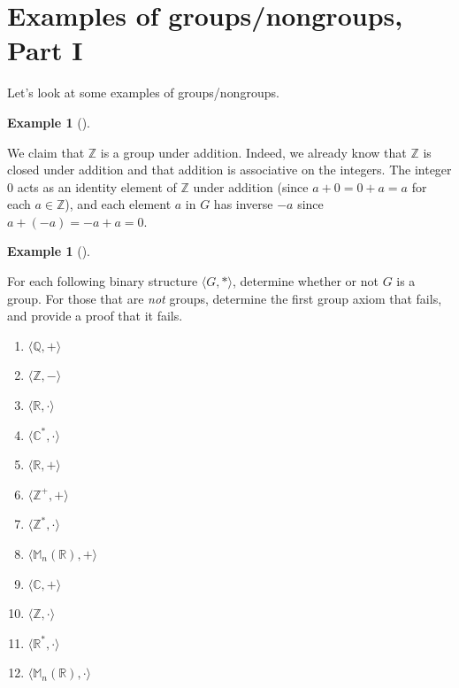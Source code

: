\documentclass[10pt,]{book}
\theoremstyle{plain}
\theoremstyle{definition}
\theoremstyle{definition}
\theoremstyle{definition}
\newtheorem{example}[theorem]{Example}
\theoremstyle{definition}
\numberwithin{equation}{section}
\def\Z{\mathbb{Z}}
\def\R{\mathbb{R}}
\def\Q{\mathbb{Q}}
\def\C{\mathbb{C}}
\def\M{\mathbb{M}}
\begin{document}
\section[{Examples of groups/nongroups, Part I}]{Examples of groups/nongroups, Part I}\label{section-6}

    Let's look at some examples of groups/nongroups.
\begin{example}[]\label{example-10}

        We claim that \(\Z\) is a group under addition. Indeed, we already
        know that \(\Z\) is closed under addition and that addition is
        associative on the integers. The integer \(0\) acts as an identity
        element of \(\Z\) under addition (since \(a+0=0+a=a\) for each \(a\in
        \Z\)), and each element \(a\) in \(G\) has inverse \(-a\) since
        \(a+(-a)=-a+a=0\).
\end{example}
\begin{example}[]\label{example-11}

            For each following binary structure \(\langle G,*\rangle\), determine whether or not \(G\) is a group.
            For those that are \emph{not } groups, determine the first group axiom  that fails, and provide a proof that it fails.
          
\leavevmode%
\begin{multicols}{4}
\begin{enumerate}
\item\hypertarget{li-79}{}
        \(\langle \Q,+\rangle\)%
\item\hypertarget{li-80}{}
        \(\langle \Z,-\rangle\)%
\item\hypertarget{li-81}{}
        \(\langle \R,\cdot\rangle\)%
\item\hypertarget{li-82}{}
        \(\langle \C^*,\cdot\rangle\)%
\item\hypertarget{li-83}{}
        \(\langle \R,+\rangle\)%
\item\hypertarget{li-84}{}
        \(\langle \Z^+,+\rangle\)%
\item\hypertarget{li-85}{}
        \(\langle \Z^*,\cdot\rangle\)%
\item\hypertarget{li-86}{}
        \(\langle \M_n(\R),+\rangle\)%
\item\hypertarget{li-87}{}
        \(\langle \C,+\rangle\)%
\item\hypertarget{li-88}{}
        \(\langle \Z,\cdot\rangle\)%
\item\hypertarget{li-89}{}
        \(\langle \R^*,\cdot\rangle\)%
\item\hypertarget{li-90}{}
        \(\langle \M_n(\R),\cdot\rangle\)%
\end{enumerate}
\end{multicols}
%
\end{example}
\par
\end{document}
